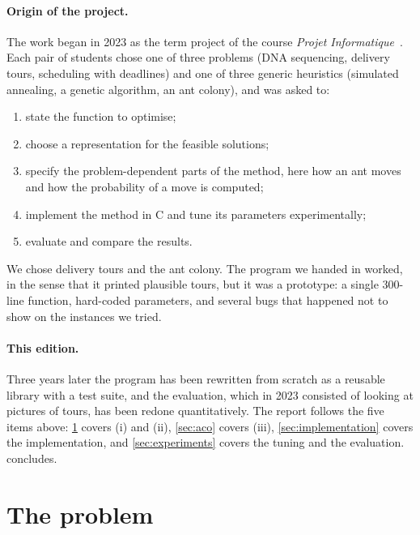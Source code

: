 \documentclass[11pt,a4paper]{article}
\begin{document}
\paragraph{Origin of the project.}
The work began in 2023 as the term project of the course \emph{Projet
    Informatique}~\cite{roupin2023projet}. Each pair of students chose one of three problems
(DNA sequencing, delivery tours, scheduling with deadlines) and one of three generic
heuristics (simulated annealing, a genetic algorithm, an ant colony), and was asked to:
\begin{enumerate}[label=(\roman*)]
    \item state the function to optimise;
    \item choose a representation for the feasible solutions;
    \item specify the problem-dependent parts of the method, here how an ant moves and how
          the probability of a move is computed;
    \item implement the method in C and tune its parameters experimentally;
    \item evaluate and compare the results.
\end{enumerate}
We chose delivery tours and the ant colony. The program we handed in worked, in the sense
that it printed plausible tours, but it was a prototype: a single 300-line function,
hard-coded parameters, and several bugs that happened not to show on the instances we tried.

\paragraph{This edition.}
Three years later the program has been rewritten from scratch as a reusable library with a
test suite, and the evaluation, which in 2023 consisted of looking at pictures of tours, has
been redone quantitatively. The report follows the five items above:
\cref{sec:problem} covers (i) and (ii), \cref{sec:aco} covers (iii),
\cref{sec:implementation} covers the implementation, and \cref{sec:experiments} covers
the tuning and the evaluation.  concludes.

\section{The problem}
\label{sec:problem}
\end{document}
